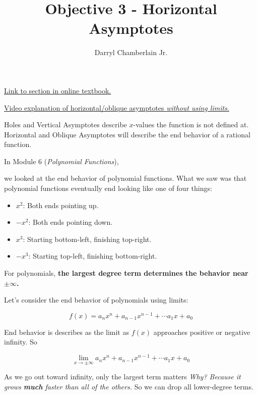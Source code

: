 \documentclass{ximera}
\author{Darryl Chamberlain Jr.}
\title{Objective 3 - Horizontal Asymptotes}
\begin{document}
\begin{abstract}

\end{abstract}
\maketitle
 
\href{https://cnx.org/contents/mwjClAV_@8.21:KNTP2r7D@14/Rational-Functions}{Link to section in online textbook.}

\href{https://mediasite.video.ufl.edu/Mediasite/Play/0957426faa87413085c428f14dc054e71d}{Video explanation of horizontal/oblique asymptotes \textit{without using limits}.}
 

Holes and Vertical Asymptotes describe $x$-values the function is not defined at. Horizontal and Oblique Asymptotes will describe the end behavior of a rational function. 

In Module 6 (\textit{Polynomial Functions}), 

we looked at the end behavior of polynomial functions. What we saw was that polynomial functions eventually end looking like one of four things:
\begin{itemize}
    \item $x^2$: Both ends pointing up.
    \item $-x^2$: Both ends pointing down.
    \item $x^3$: Starting bottom-left, finishing top-right.
    \item $-x^3$: Starting top-left, finishing bottom-right.
\end{itemize}

For polynomials, \textbf{the largest degree term determines the behavior near $\pm \infty$.} 

Let's consider the end behavior of polynomials using limits: 

$$f(x) = a_nx^n + a_{n-1}x^{n-1} + \cdots a_1 x + a_0$$

End behavior is describes as the limit as $f(x)$ approaches positive or negative infinity. So 

$$ \lim_{x \rightarrow \pm \infty} a_n x^n + a_{n-1}x^{n-1} + \cdots a_1 x + a_0$$

As we go out toward infinity, only the largest term matters \textit{Why? Because it grows \textbf{much} faster than all of the others.} So we can drop all lower-degree terms.
\end{document}
